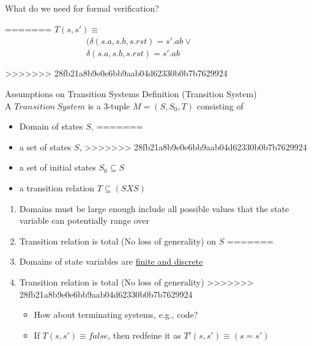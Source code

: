 \documentclass{beamer}
\begin{document}
\begin{frame}{What do we need for formal verification?}

=======
\hfill $T(s,s') \equiv$ \\
~~~~~~~~~~~~~~~~~~~$(\delta(s.a,s.b, s.rst) = s'.ab \lor$ \\
~~~~~~~~~~~~~~~~~~~$\delta(s.a,s.b,s.rst) = s'.ab$
\end{frame}

>>>>>>> 28fb21a8b9e0e6bb9aab04d62330b0b7b7629924
\begin{frame}{Assumptions on Transition Systems}
Definition (Transition System) \\
A $Transition~System$ is a 3-tuple $M = (S, S_0, T)$ consisting of
\begin{itemize}
<<<<<<< HEAD
\item Domain of states $S$,
=======
\item a set of states $S$,
>>>>>>> 28fb21a8b9e0e6bb9aab04d62330b0b7b7629924

\item a set of initial states $S_0 \subseteq S$\item a transition relation $T \subseteq (S X S)$
\end{itemize}

\begin{enumerate}
<<<<<<< HEAD
\item<1-> Domains must be large enough include all possible values that the state variable can potentially range over

\item<2-> Transition relation is total (No loss of generality) on $S$
=======
\item<1-> Domains of state variables are \underline{finite and discrete}

\item<2-> Transition relation is total (No loss of generality)
>>>>>>> 28fb21a8b9e0e6bb9aab04d62330b0b7b7629924
\begin{itemize}
\item How about terminating systems, e.g., code?
\item If $T(s,s') \equiv false$, then redfeine it as $T'(s,s') \equiv (s=s') $
\end{itemize}
\end{enumerate}
\end{frame}
\end{document}
